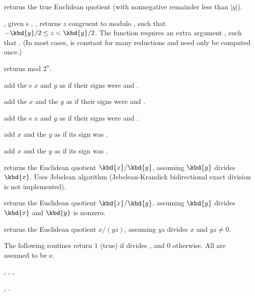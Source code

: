  returns the true Euclidean quotient
(with nonnegative remainder less than $|y|$).

, given
s , , returns $z$ congruent to  modulo ,
such that $-\kbd{y}/2 \leq z < \kbd{y}/2$. The function requires an extra
argument , such that . (In most cases, 
is constant for many reductions and  need only be computed once.)

 returns  mod $2^n$.

 add the s
$x$ and $y$ as if their signs were  and .

add the  $x$ and the  $y$ as if their signs were 
and .

 add the s $x$
and $y$ as if their signs were  and .

 add $x$ and the  $y$
as if its sign was .

 add $x$ and the  $y$
as if its sign was .


 returns the Euclidean quotient
$\kbd{x} / \kbd{y}$, assuming $\kbd{y}$ divides $\kbd{x}$. Uses Jebelean
algorithm (Jebelean-Krandick bidirectional exact division is not
implemented).

 returns the Euclidean quotient
$\kbd{x} / \kbd{y}$, assuming $\kbd{y}$ divides
$\kbd{x}$ and $\kbd{y}$ is nonzero.

 returns the Euclidean
quotient $x/(yz)$, assuming $yz$ divides $x$ and $yz \neq 0$.

The following routines return 1 (true) if  divides , and
0 otherwise. All  are assumed to be s:

,
,
,

,
.

